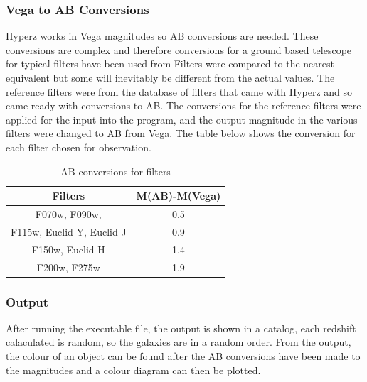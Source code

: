 		\subsubsection{Vega to AB Conversions} %
		\label{ssub:vega_to_ab_conversions}
			Hyperz works in Vega magnitudes so AB conversions are needed. These conversions are complex and therefore conversions for a ground based telescope for typical filters have been used from\cite{Graham} Filters were compared to the nearest equivalent but some will inevitably be different from the actual values. The reference filters were from the database of filters that came with Hyperz and so came ready with conversions to AB. The conversions for the reference filters were applied for the input into the program, and the output magnitude in the various filters were changed to AB from Vega. The table below shows the conversion for each filter chosen for observation.
			\begin{table}[ht]
				\begin{center}
					\begin{tabular}{c|c}
						Filters & M(AB)-M(Vega) \\
						\hline \hline
						F070w, F090w,  & 0.5 \\
						F115w, Euclid Y, Euclid J	& 0.9\\
						 F150w, Euclid H	& 1.4\\
						F200w, F275w & 1.9\\
					\end{tabular}
				\end{center}
				\caption{AB conversions for filters}
				\label{tab:AB_conversion}
			\end{table}

		\subsubsection{Output} %
		\label{ssub:output}
			After running the executable file, the output is shown in a catalog, each redshift calaculated is random, so the galaxies are in a random order. From the output, the colour of an object can be found after the AB conversions have been made to the magnitudes and a colour diagram can then be plotted.


